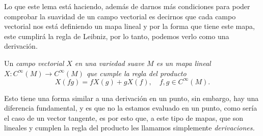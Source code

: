 Lo que este lema está haciendo, además de darnos más condiciones para poder comprobar la suavidad de un campo vectorial es decirnos que cada campo vectorial nos está definiendo un mapa lineal y por la forma que tiene este mapa, este cumplirá la regla de Leibniz, por lo tanto, podemos verlo como una derivación.

\begin{definition}
	Un \it{campo vectorial} $X$ en una variedad suave $M$ es un mapa lineal $X: C^{\infty}(M) \to C^{\infty}(M)$ que cumple la regla del producto
	\[
		X(fg) = fX(g) + gX(f), \quad f,g \in C^{\infty}(M).
	\]
\end{definition}

Esto tiene una forma similar a una derivación en un punto, sin embargo, hay una diferencia fundamental, y es que no la estamos evaluado en un punto, como sería el caso de un vector tangente, es por esto que, a este tipo de mapas, que son lineales y cumplen la regla del producto les llamamos simplemente \it{derivaciones}.
